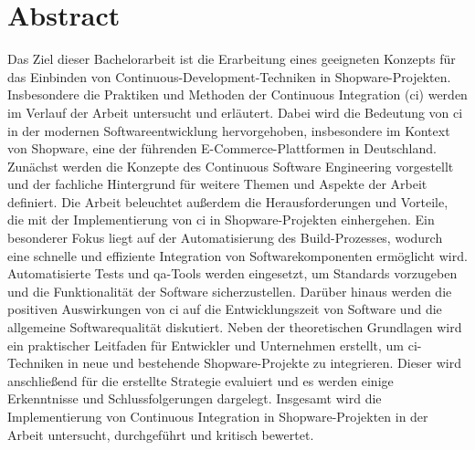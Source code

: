 
\section*{Abstract} \label{sec:00-abstract}

Das Ziel dieser Bachelorarbeit ist die Erarbeitung eines geeigneten Konzepts für das Einbinden von
Continuous-Development-Techniken in Shopware-Projekten.
Insbesondere die Praktiken und Methoden der Continuous Integration (\acrshort{ci}) werden im Verlauf der Arbeit
untersucht und erläutert.
Dabei wird die Bedeutung von \acrshort{ci} in der modernen Softwareentwicklung hervorgehoben, insbesondere im Kontext
von Shopware, eine der führenden E-Commerce-Plattformen in Deutschland.
Zunächst werden die Konzepte des Continuous Software Engineering vorgestellt und der fachliche Hintergrund für
weitere Themen und Aspekte der Arbeit definiert.
Die Arbeit beleuchtet außerdem die Herausforderungen und Vorteile, die mit der Implementierung von \acrshort{ci} in
Shopware-Projekten einhergehen.
Ein besonderer Fokus liegt auf der Automatisierung des Build-Prozesses, wodurch eine schnelle und effiziente
Integration von Softwarekomponenten ermöglicht wird.
Automatisierte Tests und \acrshort{qa}-Tools werden eingesetzt, um Standards vorzugeben und die Funktionalität der
Software sicherzustellen.
Darüber hinaus werden die positiven Auswirkungen von \acrshort{ci} auf die Entwicklungszeit von Software und die
allgemeine Softwarequalität diskutiert.
Neben der theoretischen Grundlagen wird ein praktischer Leitfaden für Entwickler und Unternehmen erstellt, um
\acrshort{ci}-Techniken in neue und bestehende Shopware-Projekte zu integrieren.
Dieser wird anschließend für die erstellte Strategie evaluiert und es werden einige Erkenntnisse und Schlussfolgerungen
dargelegt.
Insgesamt wird die Implementierung von Continuous Integration in Shopware-Projekten in der Arbeit untersucht,
durchgeführt und kritisch bewertet.

\clearpage
